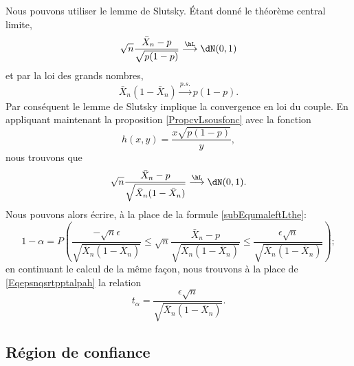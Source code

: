 \begin{description}
        Nous pouvons utiliser le lemme de Slutsky. Étant donné le théorème central limite,
        \begin{equation}
            \sqrt{n}\frac{ \bar X_n-p }{ \sqrt{p(1-p)} }\stackrel{\hL}{\longrightarrow}\dN(0,1)
        \end{equation}
        et par la loi des grands nombres,
        \begin{equation}
            \bar X_n(1-\bar X_n)\stackrel{p.s.}{\longrightarrow}p(1-p).
        \end{equation}
        Par conséquent le lemme de Slutsky implique la convergence en loi du couple. En appliquant maintenant la proposition \ref{PropcvLsousfonc} avec la fonction 
        \begin{equation}
            h(x,y)=\frac{ x\sqrt{p(1-p)} }{ y },
        \end{equation}
        nous trouvons que
        \begin{equation}
            \sqrt{n}\frac{ \bar X_n-p }{ \sqrt{\bar X_n(1-\bar X_n)} }\stackrel{\hL}{\longrightarrow}\dN(0,1).
        \end{equation}
        Nous pouvons alors écrire, à la place de la formule \eqref{subEqumaleftLthe}:
        \begin{equation}
            1-\alpha=P\left( \frac{ -\sqrt{n}\epsilon }{ \sqrt{\bar X_n(1-\bar X_n)} }\leq \sqrt{n}\frac{ \bar X_n-p }{ \sqrt{\bar X_n(1-\bar X_n)} }\leq \frac{ \epsilon\sqrt{n} }{ \sqrt{\bar X_n(1-\bar X_n)} } \right);
        \end{equation}
        en continuant le calcul de la même façon, nous trouvons à la place de \eqref{Eqepsnqsrtpptalpah} la relation
        \begin{equation}
            t_{\alpha}=\frac{ \epsilon\sqrt{n} }{ \sqrt{\bar X_n(1-\bar X_n)} }.
        \end{equation}

\end{description}

\subsection{Région de confiance}

